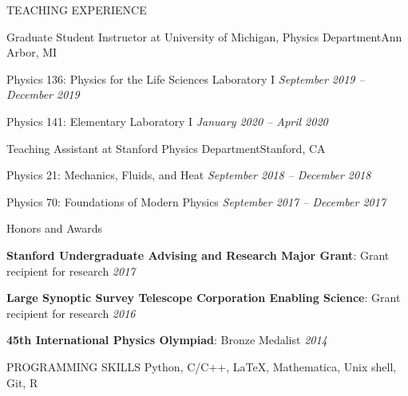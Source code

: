 \documentclass{resume} %
\begin{document}
\begin{rSection}{TEACHING EXPERIENCE} 
%
\begin{rSubsection}{Graduate Student Instructor at University of Michigan, Physics Department}{Ann Arbor, MI}{}{}
    \item Physics 136: Physics for the Life Sciences Laboratory I \hfill \textit{September 2019 -- December 2019}
    \item Physics 141: Elementary Laboratory I \hfill \textit{January 2020 -- April 2020}
\end{rSubsection} 
%
\begin{rSubsection}{Teaching Assistant at Stanford Physics Department}{Stanford, CA}{}{}
    \item Physics 21: Mechanics, Fluids, and Heat \hfill \textit{September 2018 -- December 2018}
    \item Physics 70: Foundations of Modern Physics \hfill \textit{September 2017 -- December 2017}
\end{rSubsection} 
\end{rSection}

\begin{rSection}{Honors and Awards} \itemsep -3pt \vspace*{-.25cm}
\item \textbf{Stanford Undergraduate Advising and Research Major Grant}: Grant recipient for research \hfill {\em 2017}

\item \textbf{Large Synoptic Survey Telescope Corporation Enabling Science}: Grant recipient for research \hfill {\em 2016}

\item \textbf{45th International Physics Olympiad}:  Bronze Medalist \hfill {\em 2014}
\end{rSection}
\begin{rSection}{PROGRAMMING SKILLS}
%
Python, C/C++, \LaTeX, Mathematica, Unix shell, Git, R
\end{rSection}
\end{document}
